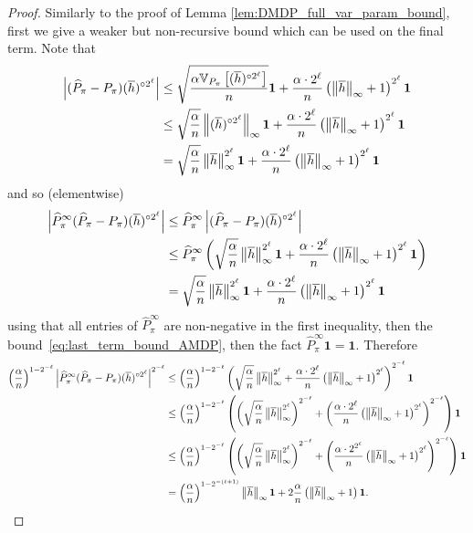 \documentclass{article}
\theoremstyle{plain}
\theoremstyle{plain}
\theoremstyle{remark}
\theoremstyle{plain}
\theoremstyle{plain}
\newcommand{\Var}{\mathbb{V}}
\newcommand{\Phat}{\widehat{P}}
\newcommand{\one}{\mathbf{1}}
\newcommand{\hc}{\overline{h}}
\begin{document}
\begin{proof}
    Similarly to the proof of Lemma \ref{lem:DMDP_full_var_param_bound}, first we give a weaker but non-recursive bound which can be used on the final term. 
Note that
\begin{align}
       \left|(\Phat_\pi - P_\pi) (\hc)^{\circ 2^\ell} \right| 
       &\leq \sqrt{\frac{\alpha \Var_{P_\pi}\left[(\hc)^{\circ 2^\ell} \right] }{n}} \one + \frac{\alpha \cdot 2^\ell  }{n} \left(\infnorm{\hc} + 1 \right)^{2^\ell} \one \nonumber \\
       & \leq  \sqrt{\frac{\alpha}{n}} \infnorm{(\hc)^{\circ  2^\ell}} \one + \frac{\alpha \cdot 2^\ell  }{n} \left(\infnorm{\hc} + 1 \right)^{2^\ell} \one \nonumber\\
       & =  \sqrt{\frac{\alpha}{n}} \infnorm{\hc}^{2^\ell} \one + \frac{\alpha \cdot 2^\ell  }{n} \left(\infnorm{\hc} + 1 \right)^{2^\ell} \one \label{eq:last_term_bound_AMDP}
    \end{align}
and so (elementwise)
\begin{align*}
    \left|\Phat_\pi^\infty (\Phat_\pi - P_\pi) (\hc)^{\circ 2^\ell} \right| & \leq \Phat_\pi^\infty \left| (\Phat_\pi - P_\pi) (\hc)^{\circ 2^\ell} \right| \\
    & \leq \Phat_\pi^\infty \left( \sqrt{\frac{\alpha}{n}} \infnorm{\hc}^{2^\ell} \one + \frac{\alpha \cdot 2^\ell  }{n} \left(\infnorm{\hc} + 1 \right)^{2^\ell} \one \right) \\
    &= \sqrt{\frac{\alpha}{n}} \infnorm{\hc}^{2^\ell} \one + \frac{\alpha \cdot 2^\ell  }{n} \left(\infnorm{\hc} + 1 \right)^{2^\ell} \one
\end{align*}
using that all entries of $\Phat_\pi^\infty$ are non-negative in the first inequality, then the bound~\eqref{eq:last_term_bound_AMDP}, then the fact $\Phat_\pi^\infty \one = \one$.
Therefore
\begin{align}
    \left(\frac{\alpha}{n}\right)^{1-2^{-\ell}}\left|\Phat_\pi^\infty (\Phat_\pi - P_\pi) (\hc)^{\circ 2^\ell} \right|^{2^{-\ell}} & \leq \left(\frac{\alpha}{n}\right)^{1-2^{-\ell}} \left(\sqrt{\frac{\alpha}{n}} \infnorm{\hc}^{2^\ell}  + \frac{\alpha \cdot 2^\ell  }{n} \left(\infnorm{\hc} + 1 \right)^{2^\ell}  \right)^{2^{-\ell}} \one \nonumber \\
    & \leq \left(\frac{\alpha}{n}\right)^{1-2^{-\ell}} \left(\left(\sqrt{\frac{\alpha}{n}} \infnorm{\hc}^{2^\ell} \right)^{2^{-\ell}}  + \left(\frac{\alpha \cdot 2^\ell  }{n} \left(\infnorm{\hc} + 1 \right)^{2^\ell}  \right)^{2^{-\ell}} \right)\one  \nonumber \\
    & \leq \left(\frac{\alpha}{n}\right)^{1-2^{-\ell}} \left(\left(\sqrt{\frac{\alpha}{n}} \infnorm{\hc}^{2^\ell} \right)^{2^{-\ell}}  + \left(\frac{\alpha \cdot 2^{2^\ell}  }{n} \left(\infnorm{\hc} + 1 \right)^{2^\ell}  \right)^{2^{-\ell}} \right)\one  \nonumber \\
    & = \left(\frac{\alpha}{n}\right)^{1-2^{-(\ell+1)}}  \infnorm{\hc} \one + 2\frac{\alpha}{n} \left(\infnorm{\hc} + 1 \right) \one \label{eq:non_recursive_bound_final_term_AMDP}.
\end{align}


\end{proof}
\end{document}
